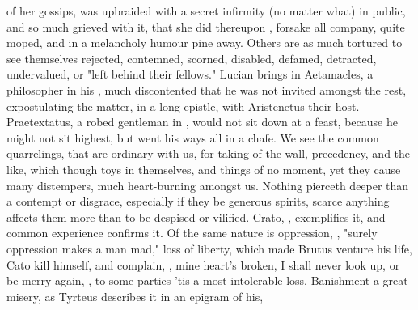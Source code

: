 of her gossips, was upbraided with a secret infirmity (no matter what) in
public, and so much grieved with it, that she did thereupon , forsake all company, quite moped, and in a melancholy humour
pine away. Others are as much tortured to see themselves rejected, contemned,
scorned, disabled, defamed, detracted, undervalued, or
"left behind their fellows." Lucian brings in Aetamacles,
a philosopher in his , much discontented
that he was not invited amongst the rest, expostulating the matter, in a long
epistle, with Aristenetus their host. Praetextatus, a robed gentleman in
\Plutarch{}, would not sit down at a feast, because he might not sit highest, but
went his ways all in a chafe. We see the common quarrelings, that are ordinary
with us, for taking of the wall, precedency, and the like, which though toys in
themselves, and things of no moment, yet they cause many distempers, much
heart-burning amongst us. Nothing pierceth deeper than a contempt or disgrace,
especially if they be generous spirits, scarce anything
affects them more than to be despised or vilified. Crato,
, exemplifies it, and common experience
confirms it. Of the same nature is oppression, , "surely
oppression makes a man mad," loss of liberty, which made Brutus venture his
life, Cato kill himself, and \Tully{} complain, , mine heart's broken, I shall never look up, or
be merry again, , to some
parties 'tis a most intolerable loss. Banishment a great misery, as Tyrteus
describes it in an epigram of his,


